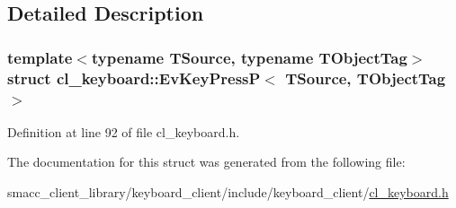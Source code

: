 \subsection{Detailed Description}
\subsubsection*{template$<$typename T\+Source, typename T\+Object\+Tag$>$\newline
struct cl\+\_\+keyboard\+::\+Ev\+Key\+Press\+P$<$ T\+Source, T\+Object\+Tag $>$}



Definition at line 92 of file cl\+\_\+keyboard.\+h.



The documentation for this struct was generated from the following file\+:\begin{DoxyCompactItemize}
\item 
smacc\+\_\+client\+\_\+library/keyboard\+\_\+client/include/keyboard\+\_\+client/\hyperlink{cl__keyboard_8h}{cl\+\_\+keyboard.\+h}\end{DoxyCompactItemize}
